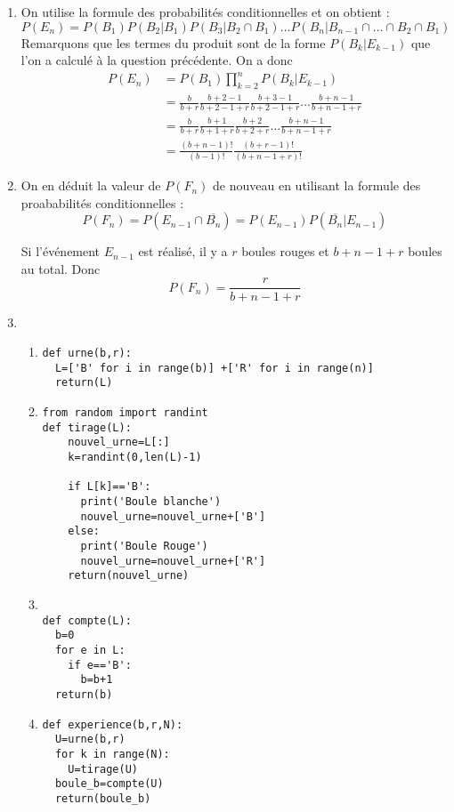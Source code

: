 \begin{correction}
\begin{enumerate}
\item On utilise la formule des probabilités conditionnelles et on obtient : 
$$P(E_n) = P(B_1) P(B_2|B_1) P(B_3|B_2\cap B_1) \dots  P(B_{n}|B_{n-1}\cap \dots \cap B_2\cap B_1) $$
Remarquons que les termes du produit sont de la forme $P(B_k |E_{k-1})$ que l'on a calculé à la question précédente. On a donc 
\begin{align*}
P(E_n) &=P(B_1) \prod_{k=2}^{n} P(B_k |E_{k-1})\\
			&=\frac{b}{b+r}\frac{b+2-1}{b+2-1+r} \frac{b+3-1}{b+2-1+r}\dots \frac{b+n-1}{b+n-1+r}\\
			&=\frac{b}{b+r}\frac{b+1}{b+1+r} \frac{b+2}{b+2+r}  \dots \frac{b+n-1}{b+n-1+r}\\
			&= \frac{(b+n-1)!}{(b-1)!} \frac{(b+r-1)!}{(b+n-1+r)!} 
\end{align*}


\item On en déduit la valeur de $P(F_n) $ de nouveau en utilisant la formule des proababilités conditionnelles : 
$$P(F_n) =P(E_{n-1}\cap \overline{B_n}) =P(E_{n-1} ) P(\overline{B_n}|E_{n-1})$$

Si l'événement $E_{n-1}$ est réalisé, il y a  $r$ boules rouges et $b+n-1+r$ boules au total. 
Donc 
$$P(F_n) = \frac{r}{b+n-1+r}$$

\item \begin{enumerate}
\item
\begin{lstlisting}
def urne(b,r):
  L=['B' for i in range(b)] +['R' for i in range(n)]
  return(L)
\end{lstlisting}

\item
\begin{lstlisting}
from random import randint
def tirage(L):
	nouvel_urne=L[:]
	k=randint(0,len(L)-1)
	
	if L[k]=='B':
	  print('Boule blanche')
	  nouvel_urne=nouvel_urne+['B']
	else:
	  print('Boule Rouge')
	  nouvel_urne=nouvel_urne+['R']
	return(nouvel_urne)
\end{lstlisting}

\item 
\begin{lstlisting}

def compte(L):
  b=0
  for e in L:
    if e=='B':
      b=b+1
  return(b)
\end{lstlisting}

\item 
\begin{lstlisting}
def experience(b,r,N):
  U=urne(b,r)
  for k in range(N):
    U=tirage(U)
  boule_b=compte(U)
  return(boule_b)
    
\end{lstlisting}

\end{enumerate}

\end{enumerate}

\end{correction}